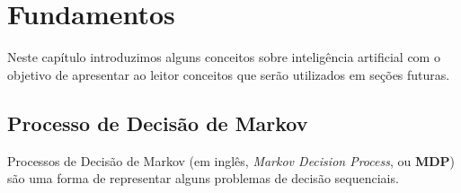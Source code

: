 \chapter{Fundamentos}
\label{chap:fund}
Neste capítulo introduzimos alguns conceitos sobre inteligência artificial com o objetivo de apresentar ao leitor conceitos que serão utilizados em seções futuras.

\section{Processo de Decisão de Markov}
\label{ssec:mdp}

Processos de Decisão de Markov (em inglês, \textit{Markov Decision Process}, ou \textbf{MDP})
são uma forma de representar alguns problemas de decisão sequenciais.

